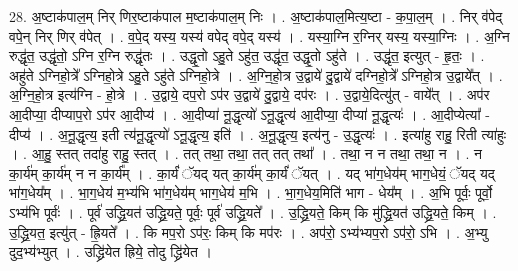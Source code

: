 \documentclass[17pt]{extarticle}
\begin{document}
28. अ॒ष्टाक॑पाल॒म् निर् णिर॒ष्टाक॑पाल म॒ष्टाक॑पाल॒म् निः । . अ॒ष्टाक॑पाल॒मित्य॒ष्टा - क॒पा॒ल॒म् । . निर् व॑पेद् वपे॒न् निर् णिर् व॑पेत् । . व॒पे॒द् यस्य॒ यस्य॑ वपेद् वपे॒द् यस्य॑ । . यस्या॒ग्नि र॒ग्निर् यस्य॒ यस्या॒ग्निः । . अ॒ग्नि रुद्धृ॑त॒ उद्धृ॑तो॒ ऽग्नि र॒ग्नि रुद्धृ॑तः । . उद्धृ॒तो ऽहु॒ते ऽहु॑त॒ उद्धृ॑त॒ उद्धृ॒तो ऽहु॑ते । . उद्धृ॑त॒ इत्युत् - हृ॒तः॒ । . अहु॑ते ऽग्निहो॒त्रे᳚ ऽग्निहो॒त्रे ऽहु॒ते ऽहु॑ते ऽग्निहो॒त्रे । . अ॒ग्नि॒हो॒त्र उ॒द्वाये॑ दु॒द्वाये॑ दग्निहो॒त्रे᳚ ऽग्निहो॒त्र उ॒द्वाये᳚त् । . अ॒ग्नि॒हो॒त्र इत्य॑ग्नि - हो॒त्रे । . उ॒द्वाये॒ दप॒रो ऽप॑र उ॒द्वाये॑ दु॒द्वाये॒ दप॑रः । . उ॒द्वाये॒दित्यु॑त् - वाये᳚त् । . अप॑र आ॒दीप्या॒ दीप्याप॒रो ऽप॑र आ॒दीप्य॑ । . आ॒दीप्या॑ नू॒द्धृत्यो॑ ऽनू॒द्धृत्य॑ आ॒दीप्या॒ दीप्या॑ नू॒द्धृत्यः॑ । . आ॒दीप्येत्या᳚ - दीप्य॑ । . अ॒नू॒द्धृत्य॒ इती त्य॑नू॒द्धृत्यो॑ ऽनू॒द्धृत्य॒ इति॑ । . अ॒नू॒द्धृत्य॒ इत्य॑नु - उ॒द्धृत्यः॑ । . इत्या॑हु राहु॒ रिती त्या॑हुः । . आ॒हु॒ स्तत् तदा॑हु राहु॒ स्तत् । . तत् तथा॒ तथा॒ तत् तत् तथा᳚ । . तथा॒ न न तथा॒ तथा॒ न । . न का॒र्य॑म् का॒र्य॑म् न न का॒र्य᳚म् । . का॒र्यं॑ ॅयद् यत् का॒र्य॑म् का॒र्यं॑ ॅयत् । . यद् भा॑ग॒धेय॑म् भाग॒धेयं॒ ॅयद् यद् भा॑ग॒धेय᳚म् । . भा॒ग॒धेय॑ म॒भ्य॑भि भा॑ग॒धेय॑म् भाग॒धेय॑ म॒भि । . भा॒ग॒धेय॒मिति॑ भाग - धेय᳚म् । . अ॒भि पूर्वः॒ पूर्वो॒ ऽभ्य॑भि पूर्वः॑ । . पूर्व॑ उद्ध्रि॒यत॑ उद्ध्रि॒यते॒ पूर्वः॒ पूर्व॑ उद्ध्रि॒यते᳚ । . उ॒द्ध्रि॒यते॒ किम् कि मु॑द्ध्रि॒यत॑ उद्ध्रि॒यते॒ किम् । . उ॒द्ध्रि॒यत॒ इत्यु॑त् - ह्रि॒यते᳚ । . कि मप॒रो ऽप॑रः॒ किम् कि मप॑रः । . अप॑रो॒ ऽभ्य॑भ्यप॒रो ऽप॑रो॒ ऽभि । . अ॒भ्यु दुद॒भ्य॑भ्युत् । . उद्ध्रि॑येत ह्रिये॒ तोदु द्ध्रि॑येत । \newline
\end{document}
